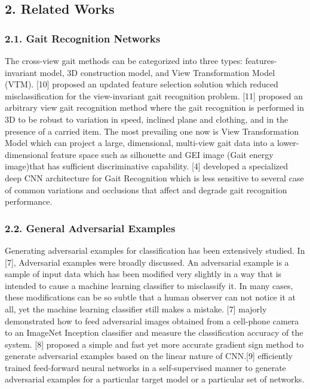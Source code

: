 \documentclass[letterpaper]{article} %
\begin{document}
\subsection{2. Related Works}

\subsubsection{2.1. Gait Recognition Networks}
The cross-view gait methods can be categorized into three types: features-invariant model, 3D construction model, and View Transformation Model (VTM). [10] proposed an updated feature selection solution which reduced misclassification for the view-invariant gait recognition problem. [11] proposed an arbitrary view gait recognition method where the gait recognition is performed in 3D to be robust to variation in speed, inclined plane and clothing, and in the presence of a carried item. The most prevailing one now is View Transformation Model which can project a large, dimensional, multi-view gait data into a lower-dimensional feature space such as silhouette and GEI image (Gait energy image)that has sufficient discriminative capability. [4] developed a specialized deep CNN architecture for Gait Recognition which is less sensitive to several case of common variations and occlusions that affect and degrade gait recognition performance. 

\subsubsection{2.2. General Adversarial Examples}
Generating adversarial examples for classification has been extensively studied. In [7], Adversarial examples were broadly discussed. An adversarial example is a sample of input data which has been modified very slightly in a way that is intended to cause a machine learning classifier to misclassify it. In many cases, these modifications can be so subtle that a human observer can not notice it at all, yet the machine learning classifier still makes a mistake. [7] majorly demonstrated how to feed adversarial images obtained from a cell-phone camera to an ImageNet Inception classifier and measure the classification accuracy of the system. [8] proposed a simple and fast yet more accurate gradient sign method to generate adversarial examples based on the linear nature of CNN.[9] efficiently trained feed-forward neural networks in a self-supervised manner to generate adversarial examples for a particular target model or a particular set of networks.
\end{document}
